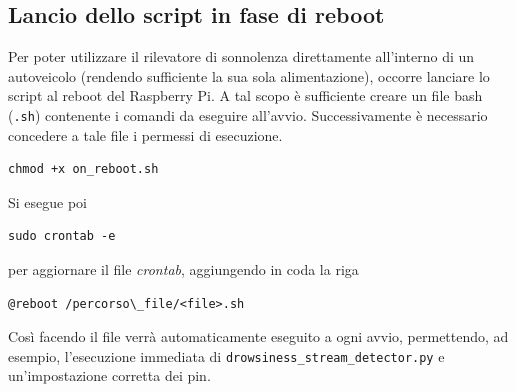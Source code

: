 \documentclass[12pt]{article}
\begin{document}
\subsection{Lancio dello script in fase di reboot}
Per poter utilizzare il rilevatore di sonnolenza direttamente all'interno di un autoveicolo (rendendo sufficiente la sua sola alimentazione), occorre lanciare lo script al reboot del Raspberry Pi. A tal scopo è sufficiente creare un file bash (\texttt{.sh}) contenente i comandi da eseguire all'avvio. Successivamente è necessario concedere a tale file i permessi di esecuzione.
\begin{lstlisting}
chmod +x on_reboot.sh
\end{lstlisting}
Si esegue poi
\begin{lstlisting}
sudo crontab -e
\end{lstlisting}
per aggiornare il file \textit{crontab}, aggiungendo in coda la riga
\begin{lstlisting}
@reboot /percorso\_file/<file>.sh
\end{lstlisting}
Così facendo il file verrà automaticamente eseguito a ogni avvio, permettendo, ad esempio, l'esecuzione immediata di \texttt{drowsiness\_stream\_detector.py} e un'impostazione corretta dei pin.

\end{document}
